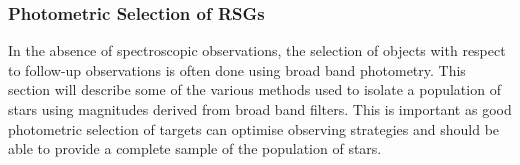 




\subsubsection{Photometric Selection of RSGs}\label{selection}

In the absence of spectroscopic observations, the selection of objects with respect to follow-up observations is often done using broad band photometry.
This section will describe some of the various methods used to isolate a population of stars using magnitudes derived from broad band filters.
This is important as good photometric selection of targets can optimise observing strategies and should be able to provide a complete sample of the population of stars.

